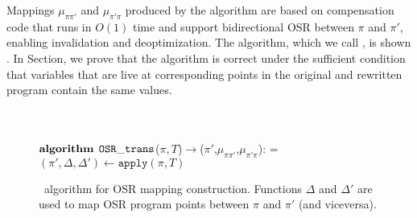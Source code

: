 \noindent Mappings $\mu_{\pi\pi'}$ and $\mu_{\pi'\pi}$ produced by the algorithm are based on compensation code that runs in $O(1)$ time and support bidirectional OSR between $\pi$ and $\pi'$, enabling invalidation and deoptimization. The algorithm, which we call \osrtrans, is shown . In Section\missing, we prove that the algorithm is correct under the sufficient condition that variables that are live at corresponding points in the original and rewritten program contain the same values.

\ifdefined\noauthorea
\begin{figure}[ht!]
\IncMargin{2em}
\begin{algorithm}[H]
\DontPrintSemicolon
\LinesNumbered
\SetAlgoNoLine
\SetNlSkip{1em} 
\Indm\Indmm
\hrulefill\\
\nonl\vspace{-2mm}\hrulefill\\
\nonl$\mathbf{algorithm} \> \> \text{${\tt OSR\_trans}$}$($\pi, T$)$\rightarrow$($\pi'$,$\mu_{\pi\pi'}$,$\mu_{\pi'\pi}$):\;
\everypar={\nl}
\Indp\Indpp
\vspace{1mm} $(\pi',\Delta,\Delta')\gets \texttt{apply}(\pi,T)$\;
\;
\vspace{-2mm}
\Indm\Indmm
\nonl\hrulefill\vspace{1mm}\\
\DecMargin{0.5em}
\caption{\label{alg:osr-trans} \osrtrans\ algorithm for OSR mapping construction. Functions $\Delta$ and $\Delta'$ are used to map OSR program points between $\pi$ and $\pi'$ (and viceversa).}
\IncMargin{0.5em}
\end{algorithm} 
\end{figure}


